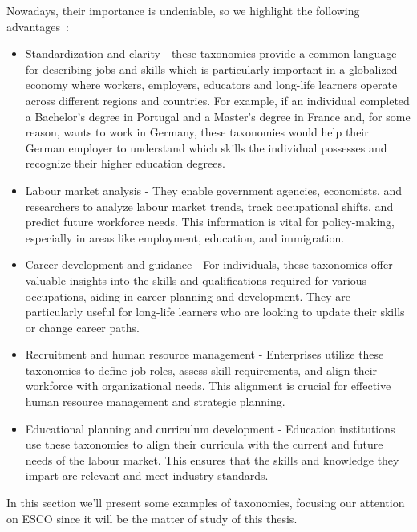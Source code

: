 Nowadays, their importance is undeniable, so we highlight the following advantages~\cite{labour_market_info, world_eco_forum}:
\begin{itemize}
\item{Standardization and clarity - these taxonomies provide a common language for describing jobs and skills which is particularly important in a globalized economy where workers, employers, educators and long-life learners operate across different regions and countries. For example, if an individual completed a Bachelor’s degree in Portugal and a Master’s degree in France and, for some reason, wants to work in Germany, these taxonomies would help their German employer to understand which skills the individual possesses and recognize their higher education degrees.}
\item{Labour market analysis - They enable government agencies, economists, and researchers to analyze labour market trends, track occupational shifts, and predict future workforce needs. This information is vital for policy-making, especially in areas like employment, education, and immigration.}
\item{Career development and guidance - For individuals, these taxonomies offer valuable insights into the skills and qualifications required for various occupations, aiding in career planning and development. They are particularly useful for long-life learners who are looking to update their skills or change career paths.}
\item{Recruitment and human resource management - Enterprises utilize these taxonomies to define job roles, assess skill requirements, and align their workforce with organizational needs. This alignment is crucial for effective human resource management and strategic planning.}
\item{Educational planning and curriculum development - Education institutions use these taxonomies to align their curricula with the current and future needs of the labour market. This ensures that the skills and knowledge they impart are relevant and meet industry standards.}
\end{itemize}


In this section we’ll present some examples of taxonomies, focusing our attention on ESCO since it will be the matter of study of this thesis.


